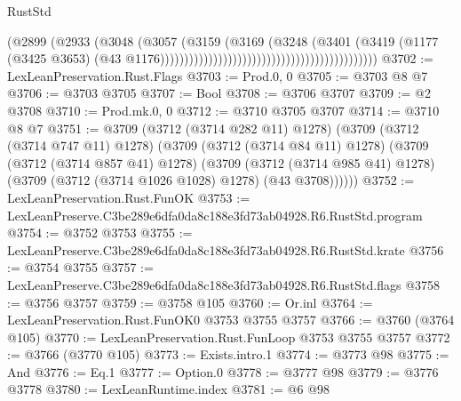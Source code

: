 \begin{lexlean}{RustStd}
\begin{coremodule}
                                                                        (@2899
                                                                          (@2933
                                                                            (@3048
                                                                              (@3057
                                                                                (@3159
                                                                                  (@3169
                                                                                    (@3248
                                                                                      (@3401
                                                                                        (@3419
                                                                                          (@1177
                                                                                            (@3425
                                                                                              @3653)
                                                                                            (@43
                                                                                              @1176)))))))))))))))))))))))))))))))))))))))))))))
@3702 := LexLeanPreservation.Rust.Flags
@3703 := Prod.{0, 0}
@3705 := @3703 @8 @7
@3706 := @3703 @3705
@3707 := Bool
@3708 := @3706 @3707
@3709 := @2 @3708
@3710 := Prod.mk.{0, 0}
@3712 := @3710 @3705 @3707
@3714 := @3710 @8 @7
@3751 := @3709
    (@3712 (@3714 @282 @11) @1278)
    (@3709
      (@3712 (@3714 @747 @11) @1278)
      (@3709
        (@3712 (@3714 @84 @11) @1278)
        (@3709
          (@3712 (@3714 @857 @41) @1278)
          (@3709
            (@3712 (@3714 @985 @41) @1278)
            (@3709 (@3712 (@3714 @1026 @1028) @1278) (@43 @3708))))))
@3752 := LexLeanPreservation.Rust.FunOK
@3753 := LexLeanPreserve.C3be289e6dfa0da8c188e3fd73ab04928.R6.RustStd.program
@3754 := @3752 @3753
@3755 := LexLeanPreserve.C3be289e6dfa0da8c188e3fd73ab04928.R6.RustStd.krate
@3756 := @3754 @3755
@3757 := LexLeanPreserve.C3be289e6dfa0da8c188e3fd73ab04928.R6.RustStd.flags
@3758 := @3756 @3757
@3759 := @3758 @105
@3760 := Or.inl
@3764 := LexLeanPreservation.Rust.FunOK0 @3753 @3755 @3757
@3766 := @3760 (@3764 @105)
@3770 := LexLeanPreservation.Rust.FunLoop @3753 @3755 @3757
@3772 := @3766 (@3770 @105)
@3773 := Exists.intro.{1}
@3774 := @3773 @98
@3775 := And
@3776 := Eq.{1}
@3777 := Option.{0}
@3778 := @3777 @98
@3779 := @3776 @3778
@3780 := LexLeanRuntime.index
@3781 := @6 @98

\end{coremodule}
\end{lexlean}
